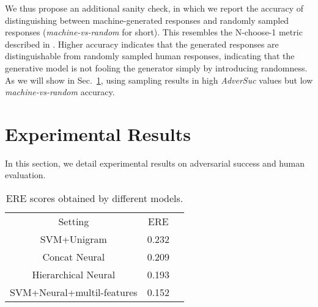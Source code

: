 We thus propose an additional sanity check, in which we report the accuracy of distinguishing between machine-generated responses and randomly sampled responses ({\it machine-vs-random} for short). 
This resembles the N-choose-1 metric described in . 
Higher accuracy indicates that the generated responses are distinguishable from randomly sampled human responses, indicating that the generative model is not fooling the generator simply by introducing randomness. 
As we will show in Sec.~\ref{sec:experiments}, using sampling results in high {\it AdverSuc} values but low {\it machine-vs-random} accuracy. 
\begin{comment}
\subsection{A Special Issue: Sequence Length}
It is widely accepted that
\sts models have a extremely strong bias towards generating short responses \cite{sountsov2016length}, and it is usually hard to generate coherent and meaningful long responses \cite{shao15}. 
The length of the sequence is thus a feature that might dominate the evaluator.\footnote{Only using this single feature, a evaluator can achieve an accuracy of roughly 75 percent.} 
On one hand, we acknowledge the inferiority of algorithms to date and the incapability of generating long, coherent responses;
on the other hand, we also want to compare different models
and evaluate 
 different aspects of responses such as coherence, meaningfulness, etc. 
Excluding the effect of this predominant feature is thus favorable in comparing different models. 
In our experimental section, we will report the discriminative success both including and excluding the effect of sequence length. 
\end{comment}

\section{Experimental Results} \label{sec:experiments}
In this section, 
we detail experimental results on adversarial success and human evaluation.  

\begin{table}[htb]
\centering
\small
\begin{tabular}{ccc}\toprule
Setting&ERE\\
SVM+Unigram&0.232\\
Concat Neural &0.209 \\
Hierarchical Neural &0.193 \\
SVM+Neural+multil-features&0.152 \\\bottomrule
\hline
\end{tabular}
\caption{ERE scores obtained by different models.}
\label{ERE}
\end{table} 


